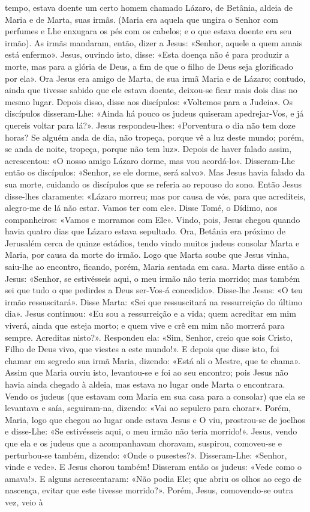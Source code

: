 \begin{paracol}{2}
{ tempo, estava doente um certo homem chamado Lázaro, de Betânia, aldeia de Maria e de Marta, suas irmãs. (Maria era aquela que ungira o Senhor com perfumes e Lhe enxugara os pés com os cabelos; e o que estava doente era seu irmão). As irmãs mandaram, então, dizer a Jesus: «Senhor, aquele a quem amais está enfermo». Jesus, ouvindo isto, disse: «Esta doença não é para produzir a morte, mas para a glória de Deus, a fim de que o filho de Deus seja glorificado por ela». Ora Jesus era amigo de Marta, de sua irmã Maria e de Lázaro; contudo, ainda que tivesse sabido que ele estava doente, deixou-se ficar mais dois dias no mesmo lugar. Depois disso, disse aos discípulos: «Voltemos para a Judeia». Os discípulos disseram-Lhe: «Ainda há pouco os judeus quiseram apedrejar-Vos, e já quereis voltar para lá?». Jesus respondeu-lhes: «Porventura o dia não tem doze horas? Se alguém anda de dia, não tropeça, porque vê a luz deste mundo; porém, se anda de noite, tropeça, porque não tem luz». Depois de haver falado assim, acrescentou: «O nosso amigo Lázaro dorme, mas vou acordá-lo». Disseram-Lhe então os discípulos: «Senhor, se ele dorme, será salvo». Mas Jesus havia falado da sua morte, cuidando os discípulos que se referia ao repouso do sono. Então Jesus disse-lhes claramente: «Lázaro morreu; mas por causa de vós, para que acrediteis, alegro-me de lá não estar. Vamos ter com ele». Disse Tomé, o Dídimo, aos companheiros: «Vamos e morramos com Ele». Vindo, pois, Jesus chegou quando havia quatro dias que Lázaro estava sepultado. Ora, Betânia era próximo de Jerusalém cerca de quinze estádios, tendo vindo muitos judeus consolar Marta e Maria, por causa da morte do irmão. Logo que Marta soube que Jesus vinha, saiu-lhe ao encontro, ficando, porém, Maria sentada em casa. Marta disse então a Jesus: «Senhor, se estivésseis aqui, o meu irmão não teria morrido; mas também sei que tudo o que pedirdes a Deus ser-Vos-á concedido». Disse-lhe Jesus: «O teu irmão ressuscitará». Disse Marta: «Sei que ressuscitará na ressurreição do último dia». Jesus continuou: «Eu sou a ressurreição e a vida; quem acreditar em mim viverá, ainda que esteja morto; e quem vive e crê em mim não morrerá para sempre. Acreditas nisto?». Respondeu ela: «Sim, Senhor, creio que sois Cristo, Filho de Deus vivo, que viestes a este mundo!». E depois que disse isto, foi chamar em segredo sua irmã Maria, dizendo: «Está ali o Mestre, que te chama». Assim que Maria ouviu isto, levantou-se e foi ao seu encontro; pois Jesus não havia ainda chegado à aldeia, mas estava no lugar onde Marta o encontrara. Vendo os judeus (que estavam com Maria em sua casa para a consolar) que ela se levantava e saía, seguiram-na, dizendo: «Vai ao sepulcro para chorar». Porém, Maria, logo que chegou ao lugar onde estava Jesus e O viu, prostrou-se de joelhos e disse-Lhe: «Se estivésseis aqui, o meu irmão não teria morrido!». Jesus, vendo que ela e os judeus que a acompanhavam choravam, suspirou, comoveu-se e perturbou-se também, dizendo: «Onde o pusestes?». Disseram-Lhe: «Senhor, vinde e vede». E Jesus chorou também! Disseram então os judeus: «Vede como o amava!». E alguns acrescentaram: «Não podia Ele; que abriu os olhos ao cego de nascença, evitar que este tivesse morrido?». Porém, Jesus, comovendo-se outra vez, veio à }
\end{paracol}
